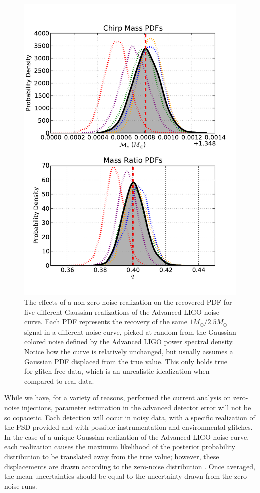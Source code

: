 \documentclass[11pt,a4paper]{emulateapj}
\begin{document}
\begin{figure}[ht!]
  \centering
 \includegraphics[trim=0cm 0cm 0cm 0cm, clip=true,scale=0.59]{noisePDF.pdf}
 \caption{The effects of a non-zero noise realization on the recovered PDF for five different Gaussian realizations of the Advanced LIGO noise curve.  Each PDF represents the recovery of the same $1M_{\odot}/2.5M_{\odot}$ signal in a different noise curve, picked at random from the Gaussian colored noise defined by the Advanced LIGO power spectral density.  Notice how the curve is relatively unchanged, but usually assumes a Gaussian PDF displaced from the true value.  This only holds true for glitch-free data, which is an unrealistic idealization when compared to real data.}
 \label{noisePDFs}
\end{figure}
  
  

While we have, for a variety of reasons, performed the current analysis on zero-noise injections,
parameter estimation in the advanced detector error will not be so copacetic. 
Each detection will occur in noisy data, with a specific realization of the PSD provided and with 
possible instrumentation and environmental glitches.  In the case of a unique Gaussian realization
of the Advanced-LIGO noise curve, each realization causes the maximum likelihood of the posterior probability 
distribution to be translated away from the true value; however, these displacements are drawn
according to the zero-noise distribution \citep{Inadequacies}.  Once averaged, the mean
uncertainties should be equal to the uncertainty drawn from the zero-noise runs.  
\end{document}
